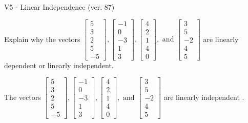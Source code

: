 \begin{exercise}
  \begin{exerciseTitle}V5 - Linear Independence (ver. 87)\end{exerciseTitle}
  \begin{exerciseStatement}
    Explain why the vectors \(\left[\begin{array}{r}
5 \\
3 \\
2 \\
5 \\
-5
\end{array}\right] , \left[\begin{array}{r}
-1 \\
0 \\
-3 \\
1 \\
3
\end{array}\right] , \left[\begin{array}{r}
4 \\
2 \\
1 \\
4 \\
0
\end{array}\right] , \text{ and } \left[\begin{array}{r}
3 \\
5 \\
-2 \\
4 \\
5
\end{array}\right]\) are linearly dependent or linearly independent.	


  \end{exerciseStatement}
  \begin{exerciseAnswer}
   The vectors \(\left[\begin{array}{r}
5 \\
3 \\
2 \\
5 \\
-5
\end{array}\right] , \left[\begin{array}{r}
-1 \\
0 \\
-3 \\
1 \\
3
\end{array}\right] , \left[\begin{array}{r}
4 \\
2 \\
1 \\
4 \\
0
\end{array}\right] , \text{ and } \left[\begin{array}{r}
3 \\
5 \\
-2 \\
4 \\
5
\end{array}\right]\) are 
  	 linearly independent  .
  


  \end{exerciseAnswer}
\end{exercise}